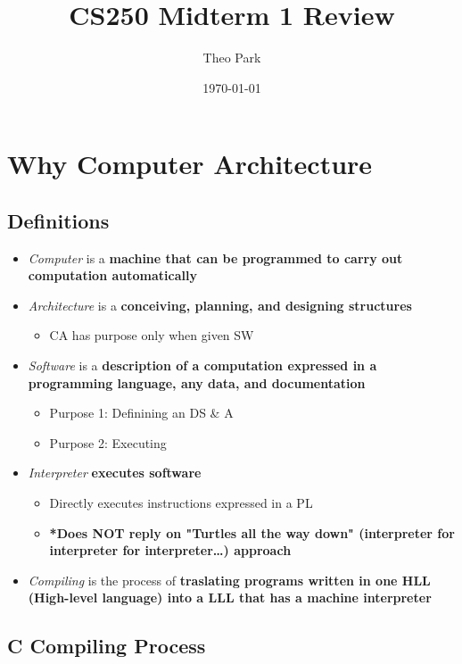 \documentclass[11pt]{article}
\author{Theo Park}
\date{\today}
\title{CS250 Midterm 1 Review}
\begin{document}
\maketitle
\setcounter{tocdepth}{2}
\tableofcontents


\section{Why Computer Architecture}
\label{sec:org273b6b5}

\subsection{Definitions}
\label{sec:orgf10deea}

\begin{itemize}
\item \emph{Computer} is a \textbf{machine that can be programmed to carry out computation automatically}
\item \emph{Architecture} is a \textbf{conceiving, planning, and designing structures}
\begin{itemize}
\item CA has purpose only when given SW
\end{itemize}
\item \emph{Software} is a \textbf{description of a computation expressed in a programming language, any data, and documentation}
\begin{itemize}
\item Purpose 1: Definining an DS \& A
\item Purpose 2: Executing
\end{itemize}
\item \emph{Interpreter} \textbf{executes software}
\begin{itemize}
\item Directly executes instructions expressed in a PL
\item \textbf{*Does NOT reply on "Turtles all the way down" (interpreter for interpreter for interpreter\ldots{}) approach}
\end{itemize}
\item \emph{Compiling} is the process of \textbf{\textbf{traslating programs written in one HLL (High-level language) into a LLL that has a machine interpreter}}
\end{itemize}

\subsection{C Compiling Process}
\label{sec:org7a480a8}
\end{document}
